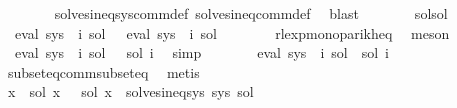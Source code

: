 \begin{isabellebody}
\ \ \ \ \ \ \isamarkupfalse%
\ solves{\isacharunderscore}{\kern0pt}ineq{\isacharunderscore}{\kern0pt}sys{\isacharunderscore}{\kern0pt}comm{\isacharunderscore}{\kern0pt}def\ solves{\isacharunderscore}{\kern0pt}ineq{\isacharunderscore}{\kern0pt}comm{\isacharunderscore}{\kern0pt}def\ \isamarkupfalse%
\ blast\isanewline
\ \ \ \ \isamarkupfalse%
\ \isamarkupfalse%
\ sol{\isacharprime}{\kern0pt}{\isacharunderscore}{\kern0pt}sol\ \isamarkupfalse%
\ {\isachardoublequoteopen}{\isasymPsi}\ {\isacharparenleft}{\kern0pt}eval\ {\isacharparenleft}{\kern0pt}sys\ {\isacharbang}{\kern0pt}\ i{\isacharparenright}{\kern0pt}\ {\isacharquery}{\kern0pt}sol{\isacharprime}{\kern0pt}{\isacharparenright}{\kern0pt}\ {\isacharequal}{\kern0pt}\ {\isasymPsi}\ {\isacharparenleft}{\kern0pt}eval\ {\isacharparenleft}{\kern0pt}sys\ {\isacharbang}{\kern0pt}\ i{\isacharparenright}{\kern0pt}\ sol{\isacharparenright}{\kern0pt}{\isachardoublequoteclose}\isanewline
\ \ \ \ \ \ \isamarkupfalse%
\ rlexp{\isacharunderscore}{\kern0pt}mono{\isacharunderscore}{\kern0pt}parikh{\isacharunderscore}{\kern0pt}eq\ \isamarkupfalse%
\ meson\isanewline
\ \ \ \ \isamarkupfalse%
\ \isamarkupfalse%
\ {\isachardoublequoteopen}{\isasymPsi}\ {\isacharparenleft}{\kern0pt}eval\ {\isacharparenleft}{\kern0pt}sys\ {\isacharbang}{\kern0pt}\ i{\isacharparenright}{\kern0pt}\ {\isacharquery}{\kern0pt}sol{\isacharprime}{\kern0pt}{\isacharparenright}{\kern0pt}\ {\isasymsubseteq}\ {\isasymPsi}\ {\isacharparenleft}{\kern0pt}sol\ i{\isacharparenright}{\kern0pt}{\isachardoublequoteclose}\ \isamarkupfalse%
\ simp\isanewline
\ \ \ \ \isamarkupfalse%
\ \isamarkupfalse%
\ {\isachardoublequoteopen}eval\ {\isacharparenleft}{\kern0pt}sys\ {\isacharbang}{\kern0pt}\ i{\isacharparenright}{\kern0pt}\ {\isacharquery}{\kern0pt}sol{\isacharprime}{\kern0pt}\ {\isasymsubseteq}\ {\isacharquery}{\kern0pt}sol{\isacharprime}{\kern0pt}\ i{\isachardoublequoteclose}\ \isamarkupfalse%
\ subseteq{\isacharunderscore}{\kern0pt}comm{\isacharunderscore}{\kern0pt}subseteq\ \isamarkupfalse%
\ metis\isanewline
\ \ \isamarkupfalse%
\isanewline
\ \ \isamarkupfalse%
\ \isamarkupfalse%
\ {\isachardoublequoteopen}{\isacharparenleft}{\kern0pt}{\isasymforall}x{\isachardot}{\kern0pt}\ {\isasymPsi}\ {\isacharparenleft}{\kern0pt}sol\ x{\isacharparenright}{\kern0pt}\ {\isacharequal}{\kern0pt}\ {\isasymPsi}\ {\isacharparenleft}{\kern0pt}{\isacharquery}{\kern0pt}sol{\isacharprime}{\kern0pt}\ x{\isacharparenright}{\kern0pt}{\isacharparenright}{\kern0pt}\ {\isasymand}\ solves{\isacharunderscore}{\kern0pt}ineq{\isacharunderscore}{\kern0pt}sys\ sys\ {\isacharquery}{\kern0pt}sol{\isacharprime}{\kern0pt}{\isachardoublequoteclose}\isanewline

\end{isabellebody}

